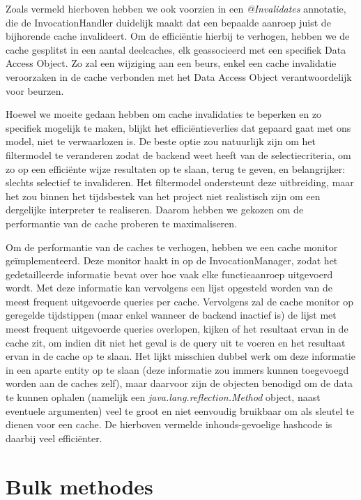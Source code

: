 Zoals vermeld hierboven hebben we ook voorzien in een \emph{@Invalidates} annotatie, die de InvocationHandler duidelijk maakt dat een bepaalde aanroep juist de bijhorende cache invalideert. Om de effici\"entie hierbij te verhogen, hebben we de cache gesplitst in een aantal deelcaches, elk geassocieerd met een specifiek Data Access Object. Zo zal een wijziging aan een beurs, enkel een cache invalidatie veroorzaken in de cache verbonden met het Data Access Object verantwoordelijk voor beurzen.

Hoewel we moeite gedaan hebben om cache invalidaties te beperken en zo specifiek mogelijk te maken, blijkt het effici\"entieverlies dat gepaard gaat met ons model, niet te verwaarlozen is. De beste optie zou natuurlijk zijn om het filtermodel te veranderen zodat de backend weet heeft van de selectiecriteria, om zo op een effici\"ente wijze resultaten op te slaan, terug te geven, en belangrijker: slechts selectief te invalideren. Het filtermodel ondersteunt deze uitbreiding, maar het zou binnen het tijdsbestek van het project niet realistisch zijn om een dergelijke interpreter te realiseren. Daarom hebben we gekozen om de performantie van de cache proberen te maximaliseren.

Om de performantie van de caches te verhogen, hebben we een cache monitor ge\"implementeerd. Deze monitor haakt in op de InvocationManager, zodat het gedetailleerde informatie bevat over hoe vaak elke functieaanroep uitgevoerd wordt. Met deze informatie kan vervolgens een lijst opgesteld worden van de meest frequent uitgevoerde queries per cache. Vervolgens zal de cache monitor op geregelde tijdstippen (maar enkel wanneer de backend inactief is) de lijst met meest frequent uitgevoerde queries overlopen, kijken of het resultaat ervan in de cache zit, om indien dit niet het geval is de query uit te voeren en het resultaat ervan in de cache op te slaan.
Het lijkt misschien dubbel werk om deze informatie in een aparte entity op te slaan (deze informatie zou immers kunnen toegevoegd worden aan de caches zelf), maar daarvoor zijn de objecten benodigd om de data te kunnen ophalen (namelijk een \emph{java.lang.reflection.Method} object, naast eventuele argumenten) veel te groot en niet eenvoudig bruikbaar om als sleutel te dienen voor een cache. De hierboven vermelde inhouds-gevoelige hashcode is daarbij veel effici\"enter.


\section{Bulk methodes}

